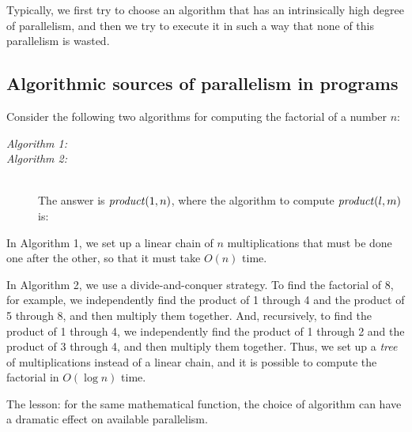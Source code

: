 Typically, we first try to choose an algorithm that has an
intrinsically high degree of parallelism, and then we try to execute
it in such a way that none of this parallelism is wasted.

\subsection{Algorithmic sources of parallelism in programs}

Consider the following two algorithms for computing the factorial of a
number $n$:
\begin{description}

\item[{\em Algorithm 1:\/}] \mbox{}

\item[{\em Algorithm 2:\/}] \mbox{} \\
The answer is ${\it product}(1,n)$, where the algorithm to compute ${\it
product}(l,m)$ is:

\end{description}
In Algorithm 1, we set up a linear chain of $n$ multiplications that
must be done one after the other, so that it must take $O(n)$ time.

In Algorithm 2, we use a divide-and-conquer strategy.  To find the factorial
of 8, for example, we independently find the product of 1 through 4 and the
product of 5 through 8, and then multiply them together.  And, recursively,
to find the product of 1 through 4, we independently find the product of 1
through 2 and the product of 3 through 4, and then multiply them together.
Thus, we set up a {\em tree\/} of multiplications instead of a linear chain,
and it is possible to compute the factorial in $O(\log n)$ time.

The lesson: for the same mathematical function, the choice of algorithm can
have a dramatic effect on available parallelism.

